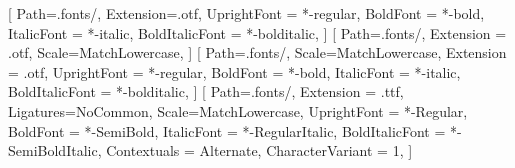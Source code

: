 \usepackage[english]{babel}

\usepackage{amsmath,amssymb,amsfonts}
\usepackage[utf8]{inputenc}

\usepackage{fontspec}
\usepackage{unicode-math}
\setmainfont{texgyretermes}[
    Path=.fonts/,
    Extension=.otf,
    UprightFont = *-regular,    
	BoldFont = *-bold,
	ItalicFont = *-italic,
	BoldItalicFont = *-bolditalic,
]
[
    Path=.fonts/,
	Extension = .otf,
	Scale=MatchLowercase,
]
\setsansfont{texgyreheros}[
    Path=.fonts/,
	Scale=MatchLowercase,
	Extension = .otf,
	UprightFont = *-regular,    
	BoldFont = *-bold,
	ItalicFont = *-italic,
	BoldItalicFont = *-bolditalic,
]
\setmonofont{JuliaMono}[
    Path=.fonts/,
	Extension = .ttf,
	Ligatures=NoCommon,
	Scale=MatchLowercase,
	UprightFont = *-Regular,
	BoldFont = *-SemiBold,
	ItalicFont = *-RegularItalic,
	BoldItalicFont = *-SemiBoldItalic,
	Contextuals = Alternate,
	CharacterVariant = 1,
]

\usepackage{lastpage}

\usepackage{gensymb}

\usepackage{setspace}

\usepackage{ccicons}

\usepackage[hang,flushmargin]{footmisc}

\usepackage{geometry}

\setlength{\parindent}{0pt}
\setlength{\parskip}{6pt plus 2pt minus 1pt}

\usepackage{fancyhdr}
\renewcommand{\headrulewidth}{0pt}